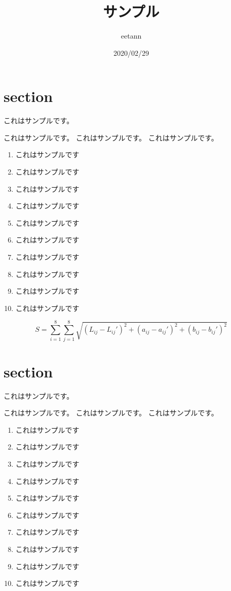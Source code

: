 \documentclass{jsarticle}
\begin{document}
\begin{titlepage}
    \title{サンプル}
    \date{2020/02/29}
    \author{eetann}
    \maketitle
\end{titlepage}

\section{section}
これはサンプルです。


これはサンプルです。
これはサンプルです。
これはサンプルです。

\begin{enumerate}
    \item これはサンプルです
    \item これはサンプルです
    \item これはサンプルです
    \item これはサンプルです
    \item これはサンプルです
    \item これはサンプルです
    \item これはサンプルです
    \item これはサンプルです
    \item これはサンプルです
    \item これはサンプルです
\end{enumerate}

\begin{equation}
    \label{sLab1}
    S=\sum_{i=1}^{8} \sum_{j=1}^{8}
    \sqrt{(L_{ij} - L_{ij}')^2 + (a_{ij} - a_{ij}')^2 + (b_{ij} - b_{ij}')^2}
\end{equation}

\section{section}
これはサンプルです。


これはサンプルです。
これはサンプルです。
これはサンプルです。

\begin{enumerate}
    \item これはサンプルです
    \item これはサンプルです
    \item これはサンプルです
    \item これはサンプルです
    \item これはサンプルです
    \item これはサンプルです
    \item これはサンプルです
    \item これはサンプルです
    \item これはサンプルです
    \item これはサンプルです
\end{enumerate}
\end{document}

